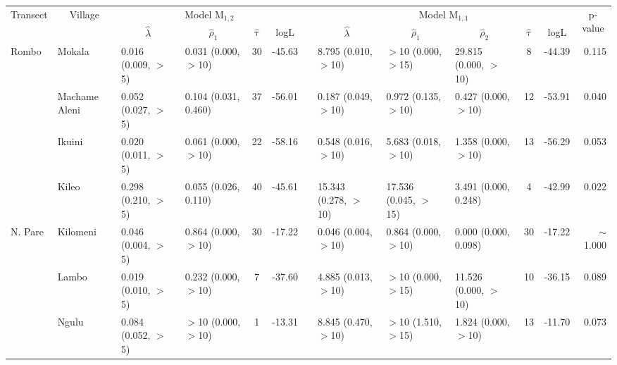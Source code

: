 \begin{tabular}{llllccclllccr} 
\toprule
\multicolumn{1}{c}{\multirow{2}{*}{Transect}} & \multicolumn{1}{c}{\multirow{2}{*}{Village}} & \multicolumn{4}{c}{Model M$_{1,2}$} & \multicolumn{1}{c}{} & \multicolumn{5}{c}{Model M$_{1,1}$} & \multicolumn{1}{c}{\multirow{2}{*}{p-value}}  \\ 
\cmidrule{3-6}\cmidrule{8-12}
\multicolumn{1}{c}{} & \multicolumn{1}{c}{} & \multicolumn{1}{c}{$\hat{\lambda}$} & \multicolumn{1}{c}{$\hat{\rho}_1$} & \multicolumn{1}{c}{$\hat{\uptau}$} & \multicolumn{1}{c}{logL} & \multicolumn{1}{c}{} & \multicolumn{1}{c}{$\hat{\lambda}$} & \multicolumn{1}{c}{$\hat{\rho}_1$} & \multicolumn{1}{c}{$\hat{\rho}_2$} & \multicolumn{1}{c}{$\hat{\uptau}$} & \multicolumn{1}{c}{logL} & \multicolumn{1}{c}{} \\ 
\midrule
Rombo       & Mokala         & 0.016 (0.009, $>$5)   & 0.031 (0.000, $>$10)   & 30  & -45.63  & & 8.795  (0.010, $>$10)   & $>$10  (0.000, $>$15)   & 29.815 (0.000, $>$10)   & 8   & -44.39   & 0.115\\
            & Machame Aleni  & 0.052 (0.027, $>$5)   & 0.104 (0.031, 0.460)   & 37  & -56.01  & & 0.187  (0.049, $>$10)   & 0.972  (0.135, $>$10)   & 0.427  (0.000, $>$10)   & 12  & -53.91   & 0.040\\
            & Ikuini         & 0.020 (0.011, $>$5)   & 0.061 (0.000, $>$10)   & 22  & -58.16  & & 0.548  (0.016, $>$10)   & 5.683  (0.018, $>$10)   & 1.358  (0.000, $>$10)   & 13  & -56.29   & 0.053\\
            & Kileo          & 0.298 (0.210, $>$5)   & 0.055 (0.026, 0.110)   & 40  & -45.61  & & 15.343 (0.278, $>$10)   & 17.536 (0.045, $>$15)   & 3.491  (0.000, 0.248)   & 4   & -42.99   & 0.022\\
\cmidrule{2-13}
N. Pare     & Kilomeni       & 0.046 (0.004, $>$5)   & 0.864 (0.000, $>$10)   & 30  & -17.22  & & 0.046  (0.004, $>$10)   & 0.864  (0.000, $>$10)   & 0.000  (0.000, 0.098)   & 30  & -17.22   & $\sim$1.000\\
            & Lambo          & 0.019 (0.010, $>$5)   & 0.232 (0.000, $>$10)   & 7   & -37.60  & & 4.885  (0.013, $>$10)   & $>$10  (0.000, $>$15)   & 11.526 (0.000, $>$10)   & 10  & -36.15   & 0.089\\
            & Ngulu          & 0.084 (0.052, $>$5)   & $>$10 (0.000, $>$10)   & 1   & -13.31  & & 8.845  (0.470, $>$10)   & $>$10  (1.510, $>$15)   & 1.824  (0.000, $>$10)   & 13  & -11.70   & 0.073\\

\end{tabular}
